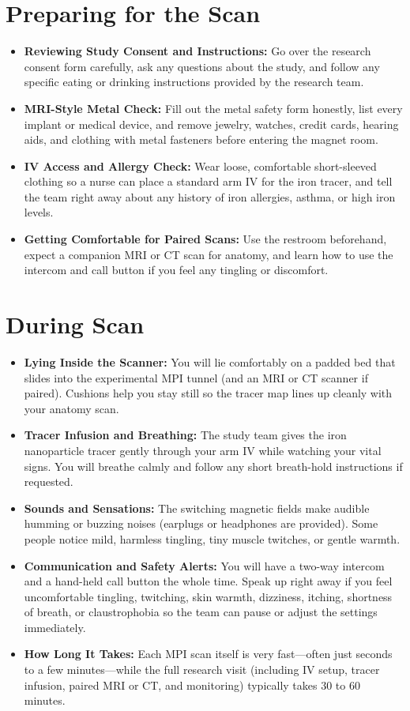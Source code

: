 \section{Preparing for the Scan}

\begin{itemize}
    \item \textbf{Reviewing Study Consent and Instructions:} Go over the research consent form carefully, ask any questions about the study, and follow any specific eating or drinking instructions provided by the research team.
    \item \textbf{MRI-Style Metal Check:} Fill out the metal safety form honestly, list every implant or medical device, and remove jewelry, watches, credit cards, hearing aids, and clothing with metal fasteners before entering the magnet room.
    \item \textbf{IV Access and Allergy Check:} Wear loose, comfortable short-sleeved clothing so a nurse can place a standard arm IV for the iron tracer, and tell the team right away about any history of iron allergies, asthma, or high iron levels.
    \item \textbf{Getting Comfortable for Paired Scans:} Use the restroom beforehand, expect a companion MRI or CT scan for anatomy, and learn how to use the intercom and call button if you feel any tingling or discomfort.
\end{itemize}

\section{During Scan}

\begin{itemize}
    \item \textbf{Lying Inside the Scanner:} You will lie comfortably on a padded bed that slides into the experimental MPI tunnel (and an MRI or CT scanner if paired). Cushions help you stay still so the tracer map lines up cleanly with your anatomy scan.
    \item \textbf{Tracer Infusion and Breathing:} The study team gives the iron nanoparticle tracer gently through your arm IV while watching your vital signs. You will breathe calmly and follow any short breath-hold instructions if requested.
    \item \textbf{Sounds and Sensations:} The switching magnetic fields make audible humming or buzzing noises (earplugs or headphones are provided). Some people notice mild, harmless tingling, tiny muscle twitches, or gentle warmth.
    \item \textbf{Communication and Safety Alerts:} You will have a two-way intercom and a hand-held call button the whole time. Speak up right away if you feel uncomfortable tingling, twitching, skin warmth, dizziness, itching, shortness of breath, or claustrophobia so the team can pause or adjust the settings immediately.
    \item \textbf{How Long It Takes:} Each MPI scan itself is very fast---often just seconds to a few minutes---while the full research visit (including IV setup, tracer infusion, paired MRI or CT, and monitoring) typically takes 30 to 60 minutes.
\end{itemize}

